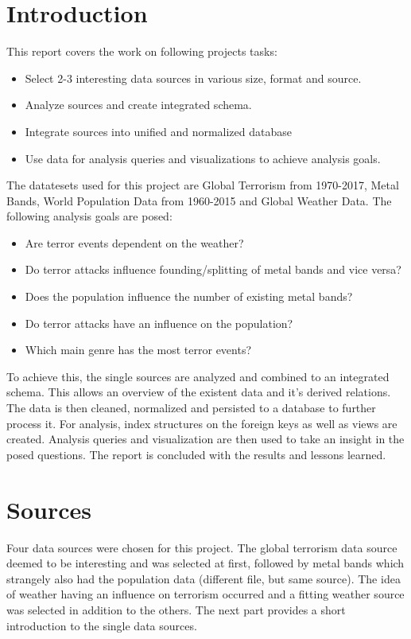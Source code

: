 \section{Introduction}
This report covers the work on following projects tasks:
\begin{itemize}
\item Select 2-3 interesting data sources in various size, format and source.
\item Analyze sources and create integrated schema.
\item Integrate sources into unified and normalized database
\item Use data for analysis queries and visualizations to achieve analysis goals.
\end{itemize}
The datatesets used for this project are Global Terrorism from 1970-2017, Metal Bands, World Population Data from 1960-2015 and Global Weather Data. The following analysis goals are posed:
\begin{itemize}
	\item Are terror events dependent on the weather?
	\item Do terror attacks influence founding/splitting of metal bands and vice versa?
	\item Does the population influence the number of existing metal bands?
	\item Do terror attacks have an influence on the population?
	\item Which main genre has the most terror events?
\end{itemize}
To achieve this, the single sources are analyzed and combined to an integrated schema. This allows an overview of the existent data and it's derived relations. The data is then cleaned, normalized and persisted to a database to further process it. For analysis, index structures on the foreign keys as well as views are created. Analysis queries and visualization are then used to take an insight in the posed questions. The report is concluded with the results and lessons learned.


\section{Sources}
Four data sources were chosen for this project. The global terrorism data source  deemed to be interesting and was selected at first, followed by metal bands which strangely also had the population data (different file, but same source). The idea of weather having an influence on terrorism occurred and a fitting weather source was selected in addition to the others. The next part provides a short introduction to the single data sources.

